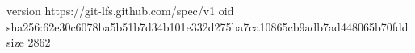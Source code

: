 version https://git-lfs.github.com/spec/v1
oid sha256:62e30c6078ba5b51b7d34b101e332d275ba7ca10865cb9adb7ad448065b70fdd
size 2862
